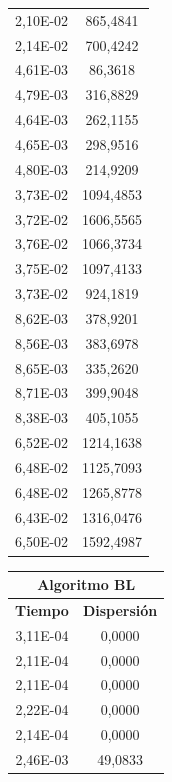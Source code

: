 \begin{figure}[h]
\begin{minipage}[c]{0.32\textwidth}
\begin{tabular}{|c|c|}
            2,10E-02 &  865,4841\\ 
            2,14E-02 &  700,4242\\ 
            4,61E-03 &  86,3618\\ 
            4,79E-03 &  316,8829\\ 
            4,64E-03 &  262,1155\\ 
            4,65E-03 &  298,9516\\ 
            4,80E-03 &  214,9209\\ 
            3,73E-02 &  1094,4853\\ 
            3,72E-02 &  1606,5565\\ 
            3,76E-02 &  1066,3734\\ 
            3,75E-02 &  1097,4133\\ 
            3,73E-02 &  924,1819\\ 
            8,62E-03 &  378,9201\\ 
            8,56E-03 &  383,6978\\ 
            8,65E-03 &  335,2620\\ 
            8,71E-03 &  399,9048\\ 
            8,38E-03 &  405,1055\\ 
            6,52E-02 &  1214,1638\\ 
            6,48E-02 &  1125,7093\\ 
            6,48E-02 &  1265,8778\\ 
            6,43E-02 &  1316,0476\\ 
            6,50E-02 &  1592,4987\\ 
	        \hline
	    \end{tabular}
	\end{minipage}
	\begin{minipage}[c]{0.32\textwidth}
	    \begin{tabular}{|c|c|}
	        \hline
	        \multicolumn{2}{|c|}{\textbf{Algoritmo BL}} \\
	        \hline
	        \textbf{Tiempo} & \textbf{Dispersión} \\
	        \hline
	        3,11E-04 & 0,0000\\
            2,11E-04 & 0,0000\\
            2,11E-04 & 0,0000\\
            2,22E-04 & 0,0000\\
            2,14E-04 & 0,0000\\
            2,46E-03 & 49,0833\\

\end{tabular}
\end{minipage}
\end{figure}
